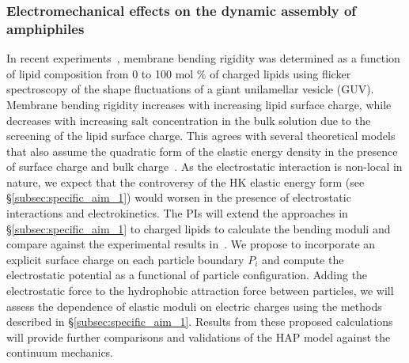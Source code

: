 
\subsubsection{Electromechanical effects on the dynamic assembly of amphiphiles \label{subsubsec:em_effects}}
In recent experiments~\cite{FaizEtAl2019_SoftMatt}, membrane bending
rigidity was determined as a function of lipid composition from 0 to 100
mol $\%$ of charged lipids using flicker spectroscopy of the shape
fluctuations of a giant unilamellar vesicle (GUV).
Membrane bending rigidity increases with increasing lipid surface
charge, while decreases with increasing salt concentration in the bulk
solution due to the screening of the lipid surface charge. This agrees
with several theoretical models~\cite{Kralchevsky1996_JCIS,
May1996_JChemPhys, LoubetEtAl2013_PRE} that also assume the quadratic
form of the elastic energy density in the presence of surface charge and
bulk charge~\cite{DuplantierGoldstein1990_PRL, Winterhalter1992_JPC}. As
the electrostatic interaction is non-local in nature, we expect that the
controversy of the HK elastic energy form (see
\S\ref{subsec:specific_aim_1}) would worsen in the presence of
electrostatic interactions and electrokinetics. The PIs will extend the
approaches in \S\ref{subsec:specific_aim_1} to charged lipids to
calculate the bending moduli and compare against the experimental
results in~\cite{FaizEtAl2019_SoftMatt}. We propose to incorporate an
explicit surface charge on each particle boundary $P_i$ and compute the
electrostatic potential as a functional of particle configuration.
Adding the electrostatic force to the hydrophobic attraction force
between particles, we will assess the dependence of elastic moduli on
electric charges using the methods described in
\S\ref{subsec:specific_aim_1}. Results from these proposed calculations
will provide further comparisons and validations of the HAP model
against the continuum mechanics.

